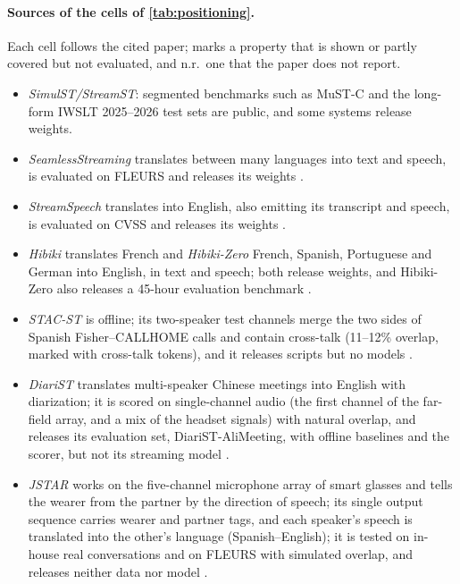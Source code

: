 \paragraph{Sources of the cells of \cref{tab:positioning}.}
Each cell follows the cited paper; \pmark{} marks a property that is shown or partly covered but not evaluated, and n.r.\ one that the paper does not report.
\begin{itemize}\setlength{\itemsep}{1pt}
  \item \emph{SimulST/StreamST}: segmented benchmarks such as MuST-C \citep{digangi2019must} and the long-form IWSLT 2025--2026 test sets \citep{abdulmumin2025findings,adelani2026speech} are public, and some systems release weights.
  \item \emph{SeamlessStreaming} translates between many languages into text and speech, is evaluated on FLEURS \citep{conneau2023fleurs} and releases its weights \citep{seamless2023seamless}.
  \item \emph{StreamSpeech} translates into English, also emitting its transcript and speech, is evaluated on CVSS \citep{jia2022cvss} and releases its weights \citep{zhang2024streamspeech}.
  \item \emph{Hibiki} translates French and \emph{Hibiki-Zero} French, Spanish, Portuguese and German into English, in text and speech; both release weights, and Hibiki-Zero also releases a 45-hour evaluation benchmark \citep{labiausse2025highfidelity,labiausse2026simultaneous}.
  \item \emph{STAC-ST} is offline; its two-speaker test channels merge the two sides of Spanish Fisher--CALLHOME calls and contain cross-talk (11--12\% overlap, marked with cross-talk tokens), and it releases scripts but no models \citep{zuluagagomez2023end}.
  \item \emph{DiariST} translates multi-speaker Chinese meetings into English with diarization; it is scored on single-channel audio (the first channel of the far-field array, and a mix of the headset signals) with natural overlap, and releases its evaluation set, DiariST-AliMeeting, with offline baselines and the scorer, but not its streaming model \citep{yang2024diarist}.
  \item \emph{JSTAR} works on the five-channel microphone array of smart glasses and tells the wearer from the partner by the direction of speech; its single output sequence carries wearer and partner tags, and each speaker's speech is translated into the other's language (Spanish--English); it is tested on in-house real conversations and on FLEURS with simulated overlap, and releases neither data nor model \citep{moritz2025transcribing}.

\end{itemize}
